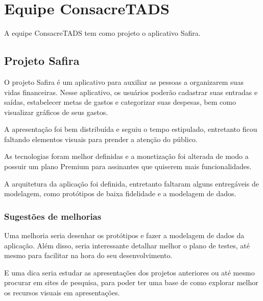 \chapter[Equipe ConsacreTADS]{Equipe ConsacreTADS}
A equipe ConsacreTADS tem como projeto o aplicativo Safira.


\section{Projeto Safira}
O projeto Safira é um aplicativo para auxiliar as pessoas a organizarem suas vidas financeiras. Nesse aplicativo, os usuários poderão cadastrar suas entradas e saídas, estabelecer metas de gastos e categorizar suas despesas, bem como visualizar gráficos de seus gastos.


A apresentação foi bem distribuída e seguiu o tempo estipulado, entretanto ficou faltando elementos visuais para prender a atenção do público. 


As tecnologias foram melhor definidas e a monetização foi alterada de modo a possuir um plano Premium para assinantes que quiserem mais funcionalidades.


A arquitetura da aplicação foi definida, entretanto faltaram alguns entregáveis de modelagem, como protótipos de baixa fidelidade e a modelagem de dados.


\subsection{Sugestões de melhorias}
Uma melhoria seria desenhar os protótipos e fazer a modelagem de dados da aplicação. Além disso, seria interessante detalhar melhor o plano de testes, até mesmo para facilitar na hora do seu desenvolvimento.

E uma dica seria estudar as apresentações dos projetos anteriores ou até mesmo procurar em sites de pesquisa, para poder ter uma base de como explorar melhor os recursos visuais em apresentações.
